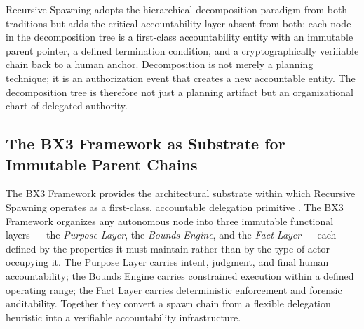 Recursive Spawning adopts the hierarchical decomposition paradigm from both traditions but adds the critical accountability layer absent from both: each node in the decomposition tree is a first-class accountability entity with an immutable parent pointer, a defined termination condition, and a cryptographically verifiable chain back to a human anchor. Decomposition is not merely a planning technique; it is an authorization event that creates a new accountable entity. The decomposition tree is therefore not just a planning artifact but an organizational chart of delegated authority.

\subsection{The BX3 Framework as Substrate for Immutable Parent Chains}

The BX3 Framework provides the architectural substrate within which Recursive Spawning operates as a first-class, accountable delegation primitive \cite{bx3framework2026}. The BX3 Framework organizes any autonomous node into three immutable functional layers --- the \textit{Purpose Layer}, the \textit{Bounds Engine}, and the \textit{Fact Layer} --- each defined by the properties it must maintain rather than by the type of actor occupying it. The Purpose Layer carries intent, judgment, and final human accountability; the Bounds Engine carries constrained execution within a defined operating range; the Fact Layer carries deterministic enforcement and forensic auditability. Together they convert a spawn chain from a flexible delegation heuristic into a verifiable accountability infrastructure.

